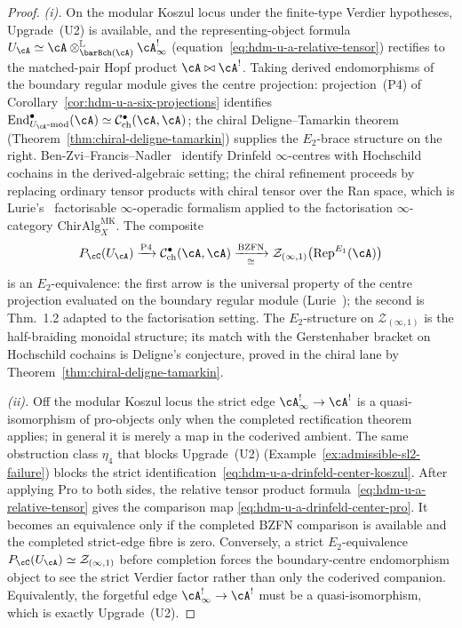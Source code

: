 \begin{proof}
\emph{(i).} On the modular Koszul locus under the finite-type
Verdier hypotheses, Upgrade~(U2) is available, and the
representing-object formula
$U_\cA \simeq \cA\otimes^{\mathbb L}_{\barBch(\cA)}\cA^{!}_\infty$
(equation~\eqref{eq:hdm-u-a-relative-tensor}) rectifies to the
matched-pair Hopf product $\cA\bowtie \cA^!$. Taking derived
endomorphisms of the boundary regular module gives the centre
projection: projection~(P4) of
Corollary~\ref{cor:hdm-u-a-six-projections} identifies
$\mathrm{End}_{U_\cA\text{-}\mathrm{mod}}^\bullet(\cA)
\simeq \mathcal{C}^{\bullet}_{\mathrm{ch}}(\cA,\cA)$; the chiral
Deligne--Tamarkin theorem
(Theorem~\ref{thm:chiral-deligne-tamarkin}) supplies the $E_2$-brace
structure on the right. Ben-Zvi--Francis--Nadler~\cite{BZFN10}
identify Drinfeld $\infty$-centres with Hochschild cochains in the
derived-algebraic setting; the chiral refinement proceeds by replacing
ordinary tensor products with chiral tensor over the Ran space, which
is Lurie's~\cite{HA} factorisable $\infty$-operadic formalism applied
to the factorisation $\infty$-category $\mathrm{ChirAlg}^{\mathrm{MK}}_X$.
The composite
\[
P_\cC(U_\cA)
\xrightarrow{\text{P4}}
\mathcal{C}^{\bullet}_{\mathrm{ch}}(\cA,\cA)
\xrightarrow[\cong]{\text{BZFN}}
\mathcal Z_{(\infty,1)}\bigl(\mathrm{Rep}^{E_1}(\cA)\bigr)
\]
is an $E_2$-equivalence: the first arrow is the universal property of
the centre projection evaluated on the boundary regular module
(Lurie~\cite[5.5]{HA}); the second is~\cite{BZFN10} Thm.~1.2 adapted
to the factorisation setting. The $E_2$-structure on
$\mathcal Z_{(\infty,1)}$ is the half-braiding monoidal structure; its
match with the Gerstenhaber bracket on Hochschild cochains is
Deligne's conjecture, proved in the chiral lane by
Theorem~\ref{thm:chiral-deligne-tamarkin}.

\emph{(ii).} Off the modular Koszul locus the strict edge
$\cA^{!}_\infty\to\cA^!$ is a quasi-isomorphism of pro-objects only
when the completed rectification theorem applies; in
general it is merely a map in the coderived ambient. The same
obstruction class $\eta_4$ that blocks Upgrade~(U2)
(Example~\ref{ex:admissible-sl2-failure}) blocks the strict
identification~\eqref{eq:hdm-u-a-drinfeld-center-koszul}. After
applying $\mathrm{Pro}$ to both sides, the relative tensor product
formula~\eqref{eq:hdm-u-a-relative-tensor} gives the comparison map
\eqref{eq:hdm-u-a-drinfeld-center-pro}. It becomes an equivalence only
if the completed BZFN comparison is available and the completed
strict-edge fibre is zero. Conversely, a strict $E_2$-equivalence
$P_\cC(U_\cA)\simeq \mathcal Z_{(\infty,1)}$ before completion forces
the boundary-centre endomorphism object to see the strict Verdier
factor rather than only the coderived companion. Equivalently, the
forgetful edge $\cA^{!}_\infty\to\cA^!$ must be a quasi-isomorphism,
which is exactly Upgrade~(U2).
\end{proof}

